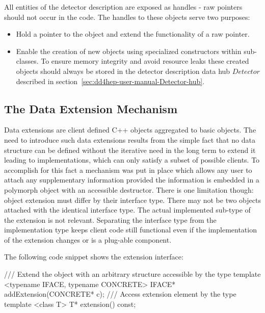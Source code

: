 \documentclass[10pt,a4paper]{article}
\begin{document}
\noindent
All entities of the \DDhep detector description are exposed as handles - 
raw pointers should not occur in the code. 
The handles to these objects serve two purposes:
\begin{itemize}\itemcompact
\item Hold a pointer to the object and extend the functionality of a raw
    pointer.
\item Enable the creation of new objects using specialized constructors
    within sub-classes. To ensure memory integrity and avoid resource 
    leaks these created objects should always be stored in the 
    detector description data hub $Detector$ described in 
    section~\ref{sec:dd4hep-user-manual-Detector-hub}.
\end{itemize}

\newpage
\subsection{The Data Extension Mechanism}
\label{sec:dd4hep-user-manual-data-extensions}
\noindent
Data extensions are client defined C++ objects aggregated to basic \DDhep objects.
The need to introduce such data extensions results from the simple fact that
no data structure can be defined without the iterative need in the long term
to extend it leading to implementations, which can only satisfy a subset of 
possible clients. To accomplish for this fact a mechanism was put in place
which allows any user to attach any supplementary information provided
the information is embedded in a polymorph object with an accessible destructor.
There is one limitation though: object extension must differ by their 
interface type. 
There may not be two objects attached with the identical interface type.
The actual implemented sub-type of the extension is not relevant.
Separating the interface type from the implementation type keeps client
code still functional even if the implementation of the extension changes 
or is a plug-able component.

\noindent
The following code snippet shows the extension interface:

\begin{code}
  /// Extend the object with an arbitrary structure accessible by the type
  template <typename IFACE, typename CONCRETE> IFACE* addExtension(CONCRETE* c);
  /// Access extension element by the type
  template <class T> T* extension() const;
\end{code}
\end{document}

